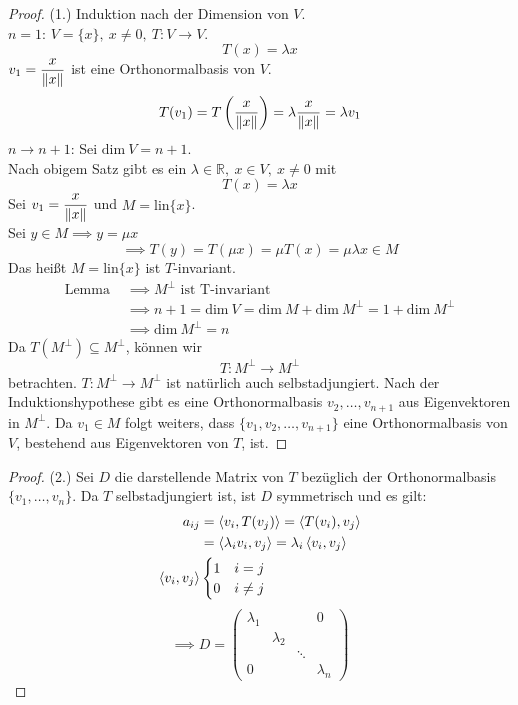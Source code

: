 \begin{proof}
    (1.) Induktion nach der Dimension von $V$.\\
    \underline{$n=1$}: $V=\{x\},\ x\neq 0,\ T: V\to V$.
    \[
        T(x)=\lambda x
    \]
    $v_1 = \displaystyle \frac{x}{\left\lVert x \right\rVert}$ ist eine Orthonormalbasis von $V$.
    \[
    T(v_1) = T\left(\frac{x}{\left\lVert x \right\rVert}\right) = \lambda \frac{x}{\left\lVert x \right\rVert} = \lambda v_1\]
    \underline{$n \to n+1$}: Sei $\mathrm{dim}\ V = n+1$.\\
    Nach obigem Satz  gibt es ein $\lambda\in \mathbb{R},\ x\in V,\ x\neq 0$ mit
    \[
        T(x) = \lambda x
    \]
    Sei $v_1 = \displaystyle \frac{x}{\left\lVert x \right\rVert}$ und $M=\mathrm{lin}\{x\}$.\\
    Sei $y\in M\implies y = \mu x$
    \[
        \implies T(y) = T(\mu x) = \mu T(x) = \mu \lambda x \in M
    \]
    Das heißt $M=\mathrm{lin}\{x\}$ ist $T$-invariant.
    \begin{align*}
        \text{Lemma } &\implies M^\bot \text{ ist T-invariant}\\
        &\implies n+1 = \mathrm{dim}\ V= \mathrm{dim}\ M + \mathrm{dim}\ M^\bot = 1 + \mathrm{dim}\ M^\bot\\
        &\implies \mathrm{dim}\ M^\bot = n
    \end{align*}
    Da $T(M^\bot)\subseteq M^\bot$, können wir
    \[
        T:M^\bot \to M^\bot
    \]
    betrachten. $T:M^\bot \to M^\bot$ ist natürlich auch selbstadjungiert. Nach der Induktionshypothese gibt es 
    eine Orthonormalbasis $v_2,\dots,v_{n+1}$ aus Eigenvektoren in $M^\bot$. Da $v_1\in M$ folgt weiters,
    dass $\{v_1,v_2,\dots,v_{n+1}\}$ eine Orthonormalbasis von $V$, bestehend aus Eigenvektoren von $T$, ist.
\end{proof}
\begin{proof}
    (2.) Sei $D$ die darstellende Matrix von $T$ bezüglich der Orthonormalbasis $\{v_1,\dots, v_n\}$. Da $T$
    selbstadjungiert ist, ist $D$ symmetrisch und es gilt:
    \begin{align*}
        a_{ij} &= \left\langle v_i,T(v_j) \right\rangle = \left\langle T(v_i),v_j \right\rangle\\
        &= \left\langle \lambda_i v_i,v_j \right\rangle= \lambda_i \left\langle v_i,v_j \right\rangle\\
        \left\langle v_i,v_j \right\rangle&\begin{cases}
            1 & i = j\\
            0 & i\neq j
        \end{cases}
    \end{align*}
    \[
        \implies D = \begin{pmatrix}
            \lambda_1 & & & 0\\
                      & \lambda_2 & & \\
                      & & \ddots \\
                      0 & & & \lambda_n
        \end{pmatrix}
    \]
\end{proof}